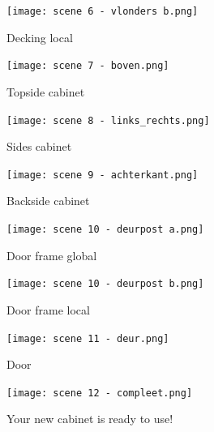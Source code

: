\documentclass{article}
\begin{document}
\begin{figure}[h!]
    \centering
    \texttt{[image: scene 6 - vlonders b.png]}
    \caption{Decking local}
\end{figure}

\begin{figure}[h!]
    \centering
    \texttt{[image: scene 7 - boven.png]}
    \caption{Topside cabinet}
\end{figure}

\begin{figure}[h!]
    \centering
    \texttt{[image: scene 8 - links\_rechts.png]}
    \caption{Sides cabinet}
\end{figure}

\begin{figure}[h!]
    \centering
    \texttt{[image: scene 9 - achterkant.png]}
    \caption{Backside cabinet}
\end{figure}

\begin{figure}[h!]
    \centering
    \texttt{[image: scene 10 - deurpost a.png]}
    \caption{Door frame global}
\end{figure}

\begin{figure}[h!]
    \centering
    \texttt{[image: scene 10 - deurpost b.png]}
    \caption{Door frame local}
\end{figure}

\begin{figure}[h!]
    \centering
    \texttt{[image: scene 11 - deur.png]}
    \caption{Door}
\end{figure}

\begin{figure}[h!]
    \centering
    \texttt{[image: scene 12 - compleet.png]}
    \caption{Your new cabinet is ready to use!}
\end{figure}
\end{document}
